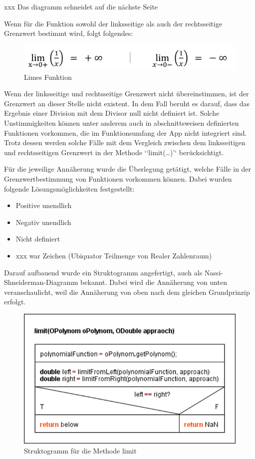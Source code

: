 xxx Das diagramm schneidet auf die nächste Seite

Wenn für die Funktion sowohl der linksseitige als auch der rechtsseitige Grenzwert bestimmt wird, folgt folgendes:  
\begin{figure}[!h]
	\includegraphics[width=\columnwidth]{img/limes-funktionen}
	\caption[Limes Funktion]{Limes Funktion\footnotemark}
\end{figure}

Wenn der linksseitige und rechtsseitige Grenzwert nicht übereinstimmen, ist der Grenzwert an dieser Stelle nicht existent. In dem Fall beruht es darauf, dass das Ergebnis einer Division mit dem Divisor null nicht definiert ist. Solche Unstimmigkeiten können unter anderem auch in abschnittsweisen definierten Funktionen vorkommen, die im Funktionsumfang der App nicht integriert sind. Trotz dessen werden solche Fälle mit dem Vergleich zwischen dem linksseitigen und rechtsseitigen Grenzwert in der Methode ‘‘limit(…)’‘ berücksichtigt.

Für die jeweilige Annäherung wurde die Überlegung getätigt, welche Fälle in der Grenzwertbestimmung von Funktionen vorkommen können. Dabei wurden folgende Lösungsmöglichkeiten festgestellt:
\begin{itemize}
	\item Positive unendlich
	\item Negativ unendlich
	\item Nicht definiert
	\item xxx war Zeichen (Ubiquator Teilmenge von Realer Zahlenraum)
\end{itemize}

Darauf aufbauend wurde ein Struktogramm angefertigt, auch als Nassi-Shneiderman-Diagramm bekannt. Dabei wird die Annäherung von unten veranschaulicht, weil die Annäherung von oben nach dem gleichen Grundprinzip erfolgt. 

\begin{figure}[!h]
	\includegraphics[scale=1]{img/struktogramm-limit}
	\caption[Struktogramm für die Methode limit]{Struktogramm für die Methode limit\footnotemark}
\end{figure}

